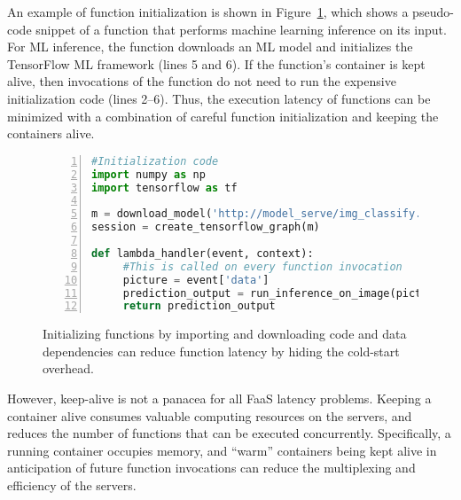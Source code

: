 An example of function initialization is shown in Figure~\ref{fig:lambda-example}, which shows a pseudo-code snippet of a function that performs machine learning inference on its input. 
For ML inference, the function downloads an ML model and initializes the TensorFlow ML framework (lines  5 and 6). 
If the function's container is kept alive, then invocations of the function do not need to run the expensive initialization code (lines 2--6). 
Thus, the execution latency of functions can be minimized with a combination of careful function  initialization and keeping the containers alive. 


\begin{figure}
\begin{lstlisting}[language=Python, numbers=left, frame=single, basicstyle=\sffamily, columns=fullflexible]
#Initialization code 
import numpy as np 
import tensorflow as tf
  
m = download_model('http://model_serve/img_classify.pb')
session = create_tensorflow_graph(m) 
  
def lambda_handler(event, context):
     #This is called on every function invocation 
     picture = event['data']
     prediction_output = run_inference_on_image(picture) 
     return prediction_output 
   \end{lstlisting}
   \vspace*{\myfigspace}
   \caption{Initializing functions by importing and downloading code and data dependencies can reduce function latency by hiding the cold-start overhead.}
   \label{fig:lambda-example}
   \vspace*{\myfigspace}
\end{figure}


However, keep-alive is not a panacea for all FaaS latency problems. 
Keeping a container alive consumes valuable computing resources on the servers, and reduces the number of functions that can be executed concurrently. 
Specifically, a running container occupies memory, and ``warm'' containers being kept alive in anticipation of future function invocations can reduce the multiplexing and efficiency of the servers.

